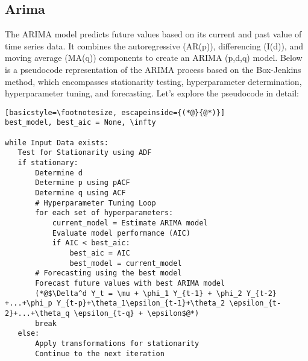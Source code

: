\documentclass{ieeeojies}
\begin{document}
\subsection{Arima}
The ARIMA model predicts future values based on its current and past value of time series data. It combines the autoregressive (AR(p)), differencing (I(d)), and moving average (MA(q)) components to create an ARIMA (p,d,q) model. 
Below is a pseudocode representation of the ARIMA process based on the Box-Jenkins method, which encompasses stationarity testing, hyperparameter determination, hyperparameter tuning, and forecasting. Let's explore the pseudocode in detail:
\begin{lstlisting}[basicstyle=\footnotesize, escapeinside={(*@}{@*)}]
best_model, best_aic = None, \infty

while Input Data exists:
   Test for Stationarity using ADF
   if stationary:
       Determine d 
       Determine p using pACF
       Determine q using ACF
       # Hyperparameter Tuning Loop
       for each set of hyperparameters:
           current_model = Estimate ARIMA model
           Evaluate model performance (AIC)
           if AIC < best_aic:
               best_aic = AIC
               best_model = current_model
       # Forecasting using the best model
       Forecast future values with best ARIMA model
       (*@$\Delta^d Y_t = \mu + \phi_1 Y_{t-1} + \phi_2 Y_{t-2} +...+\phi_p Y_{t-p}+\theta_1\epsilon_{t-1}+\theta_2 \epsilon_{t-2}+...+\theta_q \epsilon_{t-q} + \epsilon$@*)  
       break
   else:
       Apply transformations for stationarity
       Continue to the next iteration
\end{lstlisting}
\end{document}
